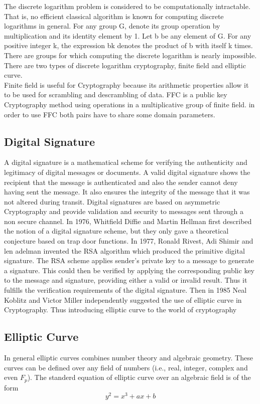 \documentclass{article}
\begin{document}
The discrete logarithm problem is considered to be computationally intractable. That is, no efficient classical algorithm is known for computing discrete logarithms in general.
For any group G, denote its group operation by multiplication and its identity element by 1. Let b be any element of G. For any positive integer k, the expression bk denotes the product of b with itself k times. There are groups for which computing the discrete logarithm is nearly impossible.
There are two types of discrete logarithm cryptography, finite field and elliptic curve. \\
 Finite field is useful for Cryptography because its arithmetic properties allow it to be used for scrambling and descrambling of data. FFC is a public key Cryptography method using operations in a multiplicative group of finite field. in order to use FFC both pairs have to share some domain parameters. 

\subsection{Digital Signature}
 A digital signature is a mathematical scheme for verifying the authenticity and legitimacy of digital messages or documents.  A valid digital signature shows the recipient that the message is authenticated and also the sender cannot deny having sent the message.  It also ensures the integrity of the message that it was not altered during transit.  Digital signatures are based on asymmetric Cryptography and provide validation and security to messages sent through a non secure channel.  In 1976, Whitfield Diffie and Martin Hellman first described the notion of a digital signature scheme, but they only gave a theoretical conjecture based on trap door functions.  In 1977, Ronald Rivest, Adi Shimir and len adelman invented the RSA algorithm which produced the primitive digital signature. The RSA scheme applies sender's  private key to a message to generate a signature.  This could then be verified by applying the corresponding  public key to the message and signature,  providing either a valid  or invalid  result. Thus it fulfills the verification requirements of the digital signature. Then in 1985 Neal Koblitz and Victor Miller  independently suggested the use of elliptic curve in Cryptography. Thus introducing elliptic curve to the world of cryptography
\subsection{Elliptic Curve}
In general elliptic curves combines number theory and algebraic geometry. These curves can be defined over any field of numbers (i.e., real, integer, complex and even $F_p$).
 The standerd equation of elliptic curve over an algebraic field is of the form
$$ y^{2}=x^{3}+ax+b$$
  
\end{document}
